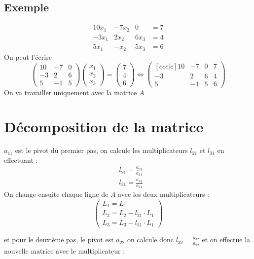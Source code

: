 \documentclass[a4paper,9pt]{extarticle}
\begin{document}
\subsection*{Exemple}
$$
\begin{array}{cccc}
10x_1 & -7x_2 & 0 & =7 \\ 
-3x_1 & 2x_2 & 6x_3 & =4 \\ 
5x_1 & -x_2 & 5x_3 & =6
\end{array} 
$$
On peut l'écrire 
$$
\begin{pmatrix}
 10 & -7 & 0       \\
 -3 & 2 &   6     \\
 5 &  -1 &   5     
\end{pmatrix}
\begin{pmatrix}
 x_1    \\
 x_2    \\
 x_3     
\end{pmatrix}
=
\begin{pmatrix}
 7  \\
 4    \\
 6     
\end{pmatrix}
\Longleftrightarrow
\begin{pmatrix}[ccc|c]
 10 & -7 & 0   & 7    \\
 -3 & 2 &   6  & 4  \\
 5 &  -1 &   5 & 6  
\end{pmatrix}
$$
On va travailler uniquement avec la matrice $A$

\section{Décomposition de la matrice}

$a_{11}$ est le pivot du premier pas, on calcule les multiplicateurs $l_{21}$ et $l_{31}$ en effectuant :
\begin{align*}
& l_{21} = \frac{a_{21}}{a_{11}} \\
& l_{31} = \frac{a_{31}}{a_{11}}
\end{align*}
On change ensuite chaque ligne de $A$ avec les deux multiplicateurs :
$$
\begin{pmatrix}
L_1  = L_1\\
L_2  = L_2 - l_{21}\cdot L_1\\
L_3  = L_3 - l_{31}\cdot L_1
\end{pmatrix}
$$

et pour le deuxième pas, le pivot est $a_{22}$ on calcule donc $l_{32} = \frac{a_{32}}{a_{22}}$ et on effectue la nouvelle matrice avec le multiplicateur :
\end{document}
